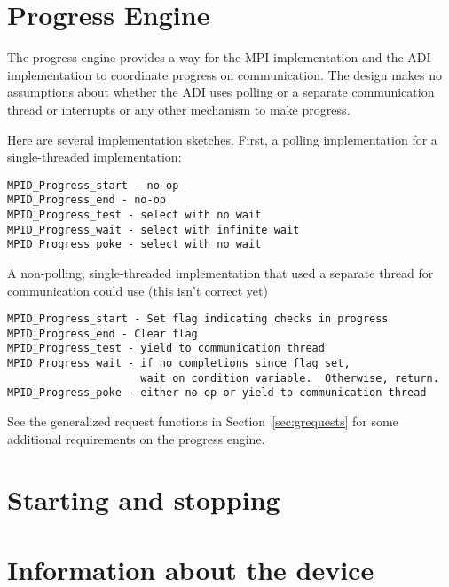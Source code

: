 \documentclass{article}
\begin{document}
\section{Progress Engine}
\label{sec:progress}
The progress engine provides a way for the MPI implementation and the
ADI implementation to coordinate progress on communication.  The
design makes no assumptions about whether the ADI uses polling or a
separate communication thread or interrupts or any other mechanism to
make progress.  

Here are several implementation sketches.
First, a polling implementation for a single-threaded implementation:
\begin{verbatim}
MPID_Progress_start - no-op
MPID_Progress_end - no-op
MPID_Progress_test - select with no wait
MPID_Progress_wait - select with infinite wait
MPID_Progress_poke - select with no wait
\end{verbatim}

A non-polling, single-threaded implementation that used a separate
thread for communication could use (this isn't correct yet)
\begin{verbatim}
MPID_Progress_start - Set flag indicating checks in progress
MPID_Progress_end - Clear flag
MPID_Progress_test - yield to communication thread
MPID_Progress_wait - if no completions since flag set, 
                     wait on condition variable.  Otherwise, return.
MPID_Progress_poke - either no-op or yield to communication thread
\end{verbatim}

See the generalized request functions in Section~\ref{sec:grequests}
for some additional requirements on the progress engine.







\section{Starting and stopping}




\section{Information about the device}

\end{document}
